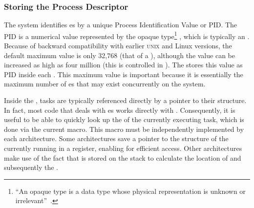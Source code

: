 \subsubsection{Storing the Process Descriptor}\label{subsubsec:Storing_Process_Descriptor}
The system identifies es by a unique Process Identification Value or PID.\@
The PID is a numerical value represented by the opaque type\footnote{``An opaque type is a data type whose physical representation is unknown or irrelevant''~\cite[pg.~26]{LKD3}.} , which is typically an .
Because of backward compatibility with earlier \textsc{unix} and Linux versions, the default maximum value is only 32,768 (that of a ), although the value can be increased as high as four million (this is controlled in ).
The  stores this value as PID inside each .
This maximum value is important because it is essentially the maximum number of es that may exist concurrently on the system.

Inside the , tasks are typically referenced directly by a pointer to their  structure.
In fact, most  code that deals with es works directly with .
Consequently, it is useful to be able to quickly look up the  of the currently executing task, which is done via the current macro.
This macro must be independently implemented by each architecture.
Some architectures save a pointer to the  structure of the currently running  in a register, enabling for efficient access.
Other architectures make use of the fact that  is stored on the  stack to calculate the location of  and subsequently the .

